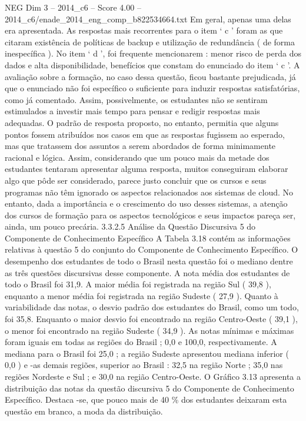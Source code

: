\begin{textsample}{NEG Dim 3 – 2014\_c6 – Score 4.00 – 2014\_c6/enade\_2014\_eng\_comp\_b822534664.txt}
Em geral, apenas uma delas era apresentada.
As respostas mais recorrentes para o item ‘ c ’ foram as que citaram existência de políticas de backup e utilização de redundância ( de forma inespecífica ).
No item ‘ d ’, foi frequente mencionarem : menor risco de perda dos dados e alta disponibilidade, benefícios que constam do enunciado do item ‘ c ’.
A avaliação sobre a formação, no caso dessa questão, ficou bastante prejudicada, já que o enunciado não foi específico o suficiente para induzir respostas satisfatórias, como já comentado.
Assim, possivelmente, os estudantes não se sentiram estimulados a investir mais tempo para pensar e redigir respostas mais adequadas.
O padrão de resposta proposto, no entanto, permitia que alguns pontos fossem atribuídos nos casos em que as respostas fugissem ao esperado, mas que tratassem dos assuntos a serem abordados de forma minimamente racional e lógica.
Assim, considerando que um pouco mais da metade dos estudantes tentaram apresentar alguma resposta, muitos conseguiram elaborar algo que pôde ser considerado, parece justo concluir que os cursos e seus programas não têm ignorado os aspectos relacionados aos sistemas de cloud.
No entanto, dada a importância e o crescimento do uso desses sistemas, a atenção dos cursos de formação para os aspectos tecnológicos e seus impactos pareça ser, ainda, um pouco precária. 3.3.2.5 Análise da Questão Discursiva 5 do Componente de Conhecimento Específico A Tabela 3.18 contém as informações relativas à questão 5 do conjunto do Componente de Conhecimento Específico.
O desempenho dos estudantes de todo o Brasil nesta questão foi o mediano dentre as três questões discursivas desse componente.
A nota média dos estudantes de todo o Brasil foi 31,9.
A maior média foi registrada na região Sul ( 39,8 ), enquanto a menor média foi registrada na região Sudeste ( 27,9 ).
Quanto à variabilidade das notas, o desvio padrão dos estudantes do Brasil, como um todo, foi 35,8.
Enquanto o maior desvio foi encontrado na região Centro-Oeste ( 39,1 ), o menor foi encontrado na região Sudeste ( 34,9 ).
As notas mínimas e máximas foram iguais em todas as regiões do Brasil ; 0,0 e 100,0, respectivamente.
A mediana para o Brasil foi 25,0 ; a região Sudeste apresentou mediana inferior ( 0,0 ) e -as demais regiões, superior ao Brasil : 32,5 na região Norte ; 35,0 nas regiões Nordeste e Sul ; e 30,0 na região Centro-Oeste.
O Gráfico 3.13 apresenta a distribuição das notas da questão discursiva 5 do Componente de Conhecimento Específico.
Destaca -se, que pouco mais de 40 \% dos estudantes deixaram esta questão em branco, a moda da distribuição.

\end{textsample}
